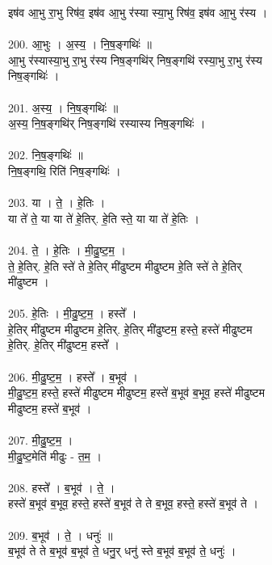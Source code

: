 इष॑व आ॒भु रा॒भु रिष॑व॒ इष॑व आ॒भु र॑स्या स्या॒भु रिष॑व॒ इष॑व आ॒भु र॑स्य ।\\
\\
200. आ॒भुः । अ॒स्य॒ । नि॒ष॒ङ्गथिः॑ ॥\\
आ॒भु र॑स्यास्या॒भु रा॒भु र॑स्य निष॒ङ्गथि॑र् निष॒ङ्गथि॑ रस्या॒भु रा॒भु र॑स्य\\
निष॒ङ्गथिः॑ ।\\
\\
201. अ॒स्य॒ । नि॒ष॒ङ्गथिः॑ ॥\\
अ॒स्य॒ नि॒ष॒ङ्गथि॑र् निष॒ङ्गथि॑ रस्यास्य निष॒ङ्गथिः॑ ।\\
\\
202. नि॒ष॒ङ्गथिः॑ ॥\\
नि॒ष॒ङ्गथि॒ रिति॑ निष॒ङ्गथिः॑ ।\\
\\
203. या । ते॒ । हे॒तिः ।\\
या ते॑ ते॒ या या ते॑ हे॒तिर्. हे॒ति स्ते॒ या या ते॑ हे॒तिः ।\\
\\
204. ते॒ । हे॒तिः । मी॒ढु॒ष्ट॒म॒ ।\\
ते॒ हे॒तिर्. हे॒ति स्ते॑ ते हे॒तिर् मी॑ढुष्टम मीढुष्टम हे॒ति स्ते॑ ते हे॒तिर्\\
मी॑ढुष्टम ।\\
\\
205. हे॒तिः । मी॒ढु॒ष्ट॒म॒ । हस्ते᳚ ।\\
हे॒तिर् मी॑ढुष्टम मीढुष्टम हे॒तिर्. हे॒तिर् मी॑ढुष्टम॒ हस्ते॒ हस्ते॑ मीढुष्टम\\
हे॒तिर्. हे॒तिर् मी॑ढुष्टम॒ हस्ते᳚ ।\\
\\
206. मी॒ढु॒ष्ट॒म॒ । हस्ते᳚ । ब॒भूव॑ ।\\
मी॒ढु॒ष्ट॒म॒ हस्ते॒ हस्ते॑ मीढुष्टम मीढुष्टम॒ हस्ते॑ ब॒भूव॑ ब॒भूव॒ हस्ते॑ मीढुष्टम\\
मीढुष्टम॒ हस्ते॑ ब॒भूव॑ ।\\
\\
207. मी॒ढु॒ष्ट॒म॒ ।\\
मी॒ढु॒ष्ट॒मेति॑ मीढुः - त॒म॒ ।\\
\\
208. हस्ते᳚ । ब॒भूव॑ । ते॒ ।\\
हस्ते॑ ब॒भूव॑ ब॒भूव॒ हस्ते॒ हस्ते॑ ब॒भूव॑ ते ते ब॒भूव॒ हस्ते॒ हस्ते॑ ब॒भूव॑ ते ।\\
\\
209. ब॒भूव॑ । ते॒ । धनुः॑ ॥\\
ब॒भूव॑ ते ते ब॒भूव॑ ब॒भूव॑ ते॒ धनु॒र् धनु॑ स्ते ब॒भूव॑ ब॒भूव॑ ते॒ धनुः॑ ।\\
\\

